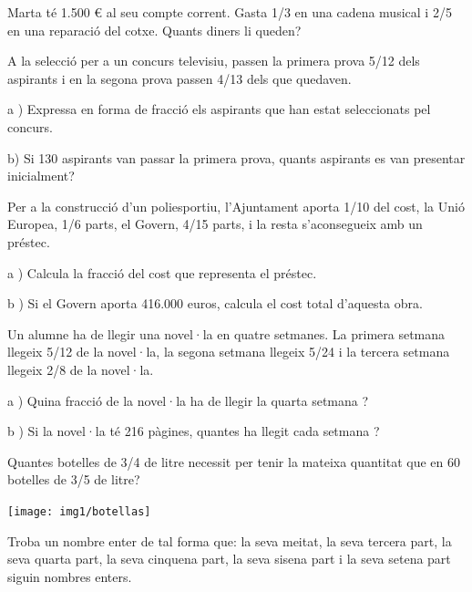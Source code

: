 \pagebreak


\begin{mylist}
	
	\exer  Marta té 1.500 € al seu compte corrent. Gasta 1/3 en una cadena musical i 2/5 en una reparació del cotxe. Quants diners li queden?
\answers{100 \euro{}}




	\exer  A la selecció per a un concurs televisiu, passen la primera prova 5/12 dels aspirants i en la segona prova passen 4/13 dels que quedaven.


a ) Expressa en forma de fracció els aspirants que han estat seleccionats pel concurs.

b) Si 130 aspirants van passar la primera prova, quants aspirants es van presentar inicialment?



	\exer   Per a la construcció d'un poliesportiu, l'Ajuntament aporta 1/10 del cost, la Unió Europea, 1/6 parts, el Govern, 4/15 parts, i la resta s'aconsegueix amb un préstec.


a ) Calcula la fracció del cost que representa el préstec.

b ) Si el Govern aporta 416.000 euros, calcula el cost total d'aquesta obra.

\answers{[7/15, 1.560.000 \euro{}]}


	\exer  Un alumne ha de llegir una novel·la en quatre setmanes. La primera setmana llegeix 5/12 de la novel·la, la segona setmana llegeix 5/24 i la tercera setmana llegeix 2/8 de la novel·la.


a ) Quina fracció de la novel·la ha de llegir la quarta setmana ?

b ) Si la novel·la té 216 pàgines, quantes ha llegit cada setmana ?


	\exer  
	\begin{minipage}[t]{0.7\textwidth}	
	  Quantes botelles de 3/4 de litre necessit per tenir la mateixa quantitat que en 60 botelles de 3/5 de litre?
\end{minipage}
\begin{minipage}[t]{0.3\textwidth}
	\centering
	\vspace{-1.75cm}
	\texttt{[image: img1/botellas]}
\end{minipage}


	\exer  Troba un nombre enter de tal forma que: la seva meitat, la seva tercera part, la seva quarta part, la seva cinquena part, la seva sisena part i la seva setena part siguin nombres enters.







\end{mylist}
